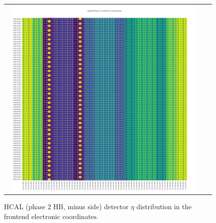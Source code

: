 \clearpage
\begin{figure}[htb]
 \begin{center}
  \begin{tabular}{cc}
   \includegraphics[angle=0,width=0.95\textwidth]{figures/appendix/ngHBM_Eta_in_FrontEnd.png}
  \end{tabular}
  \caption{HCAL (phase 2 HB, minus side) detector $\eta$ distribution in the frontend electronic coordinates.}
  \label{fig:lmapngHBMEtaFEC}
 \end{center}
\end{figure}

